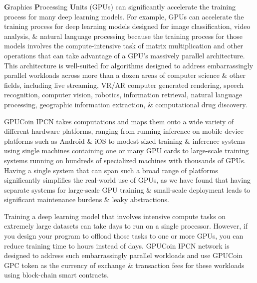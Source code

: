 \textbf{G}raphics \textbf{P}rocessing \textbf{U}nits (GPUs) can significantly accelerate the training process for many deep learning models. For example, GPUs can accelerate the training process for deep learning models designed for image classification, video analysis, \& natural language processing because the training process for those models involves the compute-intensive task of matrix multiplication and other operations that can take advantage of a GPU's massively parallel architecture. This architecture is well-suited for algorithms designed to address embarrassingly parallel workloads across more than a dozen areas of computer science \& other fields, including live streaming, VR/AR computer generated rendering, speech recognition, computer vision, robotics, information retrieval, natural language processing, geographic information extraction, \& computational drug discovery.

GPUCoin IPCN takes computations and maps them onto a wide variety of different hardware platforms, ranging from running inference on mobile device platforms such as Android \& iOS to modest-sized training \& inference systems using single machines containing one or many GPU cards to large-scale training systems running on hundreds of specialized machines with thousands of GPUs. Having a single system that can span such a broad range of platforms significantly simplifies the real-world use of GPUs, as we have found that having separate systems for large-scale GPU training \& small-scale deployment leads to significant maintenance burdens \& leaky abstractions.

Training a deep learning model that involves intensive compute tasks on extremely large datasets can take days to run on a single processor. However, if you design your program to offload those tasks to one or more GPUs, you can reduce training time to hours instead of days. GPUCoin IPCN network is designed to address such embarrassingly parallel workloads and use GPUCoin GPC token as the currency of exchange \& transaction fees for these workloads using block-chain smart contracts. 


